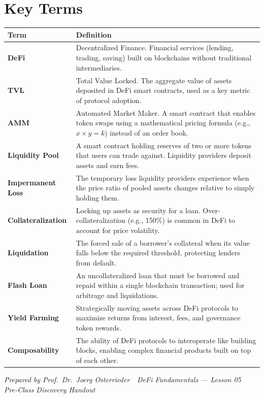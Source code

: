 \documentclass[11pt,a4paper]{article}
\begin{document}
\vspace{4pt}

\section{Key Terms}

\renewcommand{\arraystretch}{1.25}
\noindent\begin{tabular}{@{}p{3.2cm}p{11.4cm}@{}}
\toprule
\textbf{Term} & \textbf{Definition} \\
\midrule
\textbf{DeFi}               & Decentralized Finance. Financial services (lending, trading, saving) built on blockchains without traditional intermediaries. \\
\textbf{TVL}                & Total Value Locked. The aggregate value of assets deposited in DeFi smart contracts, used as a key metric of protocol adoption. \\
\textbf{AMM}                & Automated Market Maker. A smart contract that enables token swaps using a mathematical pricing formula (e.g., $x \times y = k$) instead of an order book. \\
\textbf{Liquidity Pool}     & A smart contract holding reserves of two or more tokens that users can trade against. Liquidity providers deposit assets and earn fees. \\
\textbf{Impermanent Loss}   & The temporary loss liquidity providers experience when the price ratio of pooled assets changes relative to simply holding them. \\
\textbf{Collateralization}  & Locking up assets as security for a loan. Over-collateralization (e.g., 150\%) is common in DeFi to account for price volatility. \\
\textbf{Liquidation}        & The forced sale of a borrower's collateral when its value falls below the required threshold, protecting lenders from default. \\
\textbf{Flash Loan}         & An uncollateralized loan that must be borrowed and repaid within a single blockchain transaction; used for arbitrage and liquidations. \\
\textbf{Yield Farming}      & Strategically moving assets across DeFi protocols to maximize returns from interest, fees, and governance token rewards. \\
\textbf{Composability}      & The ability of DeFi protocols to interoperate like building blocks, enabling complex financial products built on top of each other. \\
\bottomrule
\end{tabular}

\vspace{6pt}
\noindent\textcolor{mlgray}{\small\textit{Prepared by Prof.\ Dr.\ Joerg Osterrieder \,\textbullet\, DeFi Fundamentals --- Lesson 05 \,\textbullet\, Pre-Class Discovery Handout}}
\end{document}

